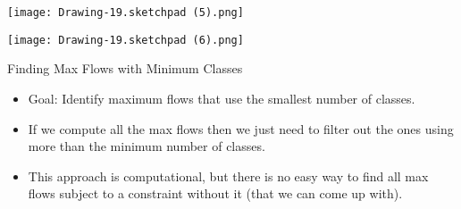 \documentclass{beamer}
\begin{document}
\begin{frame}{}
    \centering
    \texttt{[image: Drawing-19.sketchpad (5).png]}
    \vspace{0.5cm}
  
\end{frame}


\begin{frame}{}
    \centering
    \texttt{[image: Drawing-19.sketchpad (6).png]}
    \vspace{0.5cm}
    
\end{frame}





\begin{frame}{Finding Max Flows with Minimum Classes}
    \begin{itemize}
        \item Goal: Identify maximum flows that use the smallest number of classes.
        \item If we compute all the max flows then we just need to filter out the ones using more than the minimum number of classes.
        \item This approach is computational, but there is no easy way to find all max flows subject to a constraint without it (that we can come up with).
    \end{itemize}
   
\end{frame}
\end{document}
